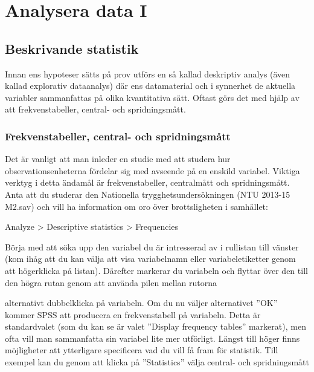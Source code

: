 \documentclass[
]{book}
\begin{document}
\hypertarget{part-analysera-data-i}{%
\part*{Analysera data I}\label{part-analysera-data-i}}

\hypertarget{beskrivande-statistik}{%
\chapter{Beskrivande statistik}\label{beskrivande-statistik}}

Innan ens hypoteser sätts på prov utförs en så kallad deskriptiv analys (även kallad explorativ dataanalys) där ens datamaterial och i synnerhet de aktuella variabler sammanfattas på olika kvantitativa sätt. Oftast görs det med hjälp av att frekvenstabeller, central- och spridningsmått.

\hypertarget{frekvenstabeller-central--och-spridningsmuxe5tt}{%
\section{Frekvenstabeller, central- och spridningsmått}\label{frekvenstabeller-central--och-spridningsmuxe5tt}}

Det är vanligt att man inleder en studie med att studera hur observationsenheterna fördelar sig med
avseende på en enskild variabel. Viktiga verktyg i detta ändamål är frekvenstabeller, centralmått och
spridningsmått. Anta att du studerar den Nationella trygghetsundersökningen (NTU 2013-15 M2.sav)
och vill ha information om oro över brottsligheten i samhället:

Analyze \textgreater{} Descriptive statistics \textgreater{} Frequencies

Börja med att söka upp den variabel du är intresserad av i rullistan till vänster (kom ihåg att du kan
välja att visa variabelnamn eller variabeletiketter genom att högerklicka på listan). Därefter markerar
du variabeln och flyttar över den till den högra rutan genom att använda pilen mellan rutorna

alternativt dubbelklicka på variabeln. Om du nu väljer alternativet ''OK'' kommer SPSS att producera en
frekvenstabell på variabeln. Detta är standardvalet (som du kan se är valet ''Display frequency tables''
markerat), men ofta vill man sammanfatta sin variabel lite mer utförligt. Längst till höger finns
möjligheter att ytterligare specificera vad du vill få fram för statistik. Till exempel kan du genom att
klicka på ''Statistics'' välja central- och spridningsmått
\end{document}
